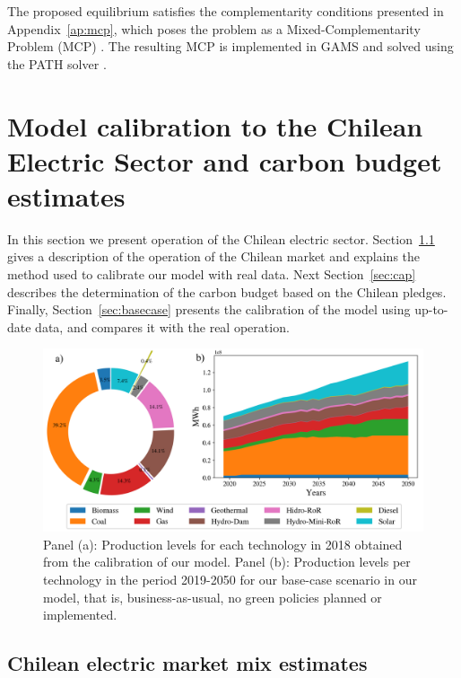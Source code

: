 \documentclass[11pt, letterpaper]{article}
\begin{document}
The proposed equilibrium satisfies the complementarity conditions presented in Appendix~\ref{ap:mcp}, which poses the problem as a Mixed-Complementarity Problem (MCP) \cite{murphy2016tutorial,feijoo2016north}. The resulting MCP is implemented in GAMS and solved using the PATH solver \cite{Ferris2000}.

\section{Model calibration to the Chilean Electric Sector and carbon budget estimates}

In this section we present operation of the Chilean electric sector. Section~\ref{sec:chiledata} gives a description of the operation of the Chilean market and explains the method used to calibrate our model with real data. Next Section~\ref{sec:cap} describes the determination of the carbon budget based on the Chilean pledges. Finally, Section~\ref{sec:basecase} presents the calibration of the model using up-to-date data, and compares it with the real operation.



\begin{figure}[ht!]
 \includegraphics[width=\textwidth]{draft_paper/Figures/figure1.png}
 \caption{Panel (a): Production levels for each technology in 2018 obtained from the calibration of our model. Panel (b): Production levels per technology in the period 2019-2050 for our base-case scenario in our model, that is, business-as-usual, no green policies planned or implemented. }
  \label{fig:bc}
  \end{figure}


\subsection{Chilean electric market mix estimates}\label{sec:chiledata}
\end{document}
